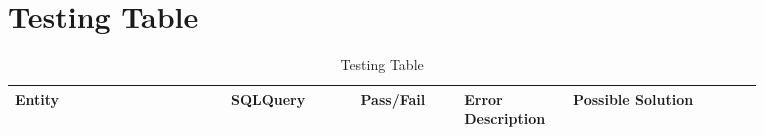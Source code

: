 \pagebreak
\section{Testing Table}

\begin{spacing}{1.25}
\begin{longtable}{ | p{0.25\linewidth} | p{0.15\linewidth} | p{0.126\linewidth} | p{0.128\linewidth} | p{0.22\linewidth} | }
\caption{Testing Table}\\
\hline
Entity		&	SQLQuery		&	Pass/Fail		&	Error Description				&	Possible Solution\\\hline

\end{longtable}
\end{spacing}